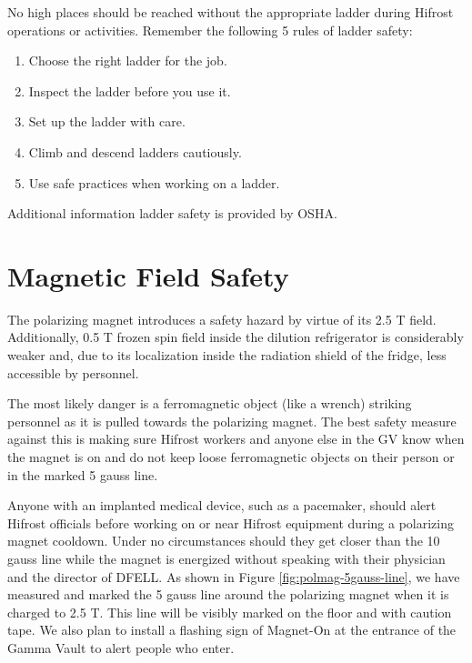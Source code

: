 No high places should be reached without the appropriate ladder during Hifrost operations or activities.  Remember the following 5 rules of ladder safety\cite{laddersafety-duke}:
\begin{enumerate}
 \item Choose the right ladder for the job.
 \item Inspect the ladder before you use it.
 \item Set up the ladder with care.
 \item Climb and descend ladders cautiously.
 \item Use safe practices when working on a ladder.
\end{enumerate}

Additional information ladder safety is provided by OSHA\cite{laddersafety-osha}.

\section{Magnetic Field Safety}

The polarizing magnet introduces a safety hazard by virtue of its 2.5 T field.  Additionally, 0.5 T frozen spin field inside the dilution refrigerator is considerably weaker and, due to its localization inside the radiation shield of the fridge, less accessible by personnel.

The most likely danger is a ferromagnetic object (like a wrench) striking personnel as it is pulled towards the polarizing magnet\cite{magnetsafety}.  The best safety measure against this is making sure Hifrost workers and anyone else in the GV know when the magnet is on and do not keep loose ferromagnetic objects on their person or in the marked 5 gauss line.

Anyone with an implanted medical device, such as a pacemaker, should alert Hifrost officials before working on or near Hifrost equipment during a polarizing magnet cooldown.  Under no circumstances should they get closer than the 10 gauss line while the magnet is energized without speaking with their physician and the director of DFELL\cite{pacemakersafety}.  As shown in Figure \ref{fig:polmag-5gauss-line}, we have measured and marked the 5 gauss line around the polarizing magnet when it is charged to 2.5 T.  This line will be visibly marked on the floor and with caution tape.  We also plan to install a flashing sign of Magnet-On at the entrance of the Gamma Vault to alert people who enter.

